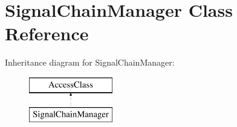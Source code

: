 \hypertarget{classSignalChainManager}{\section{Signal\-Chain\-Manager Class Reference}
\label{classSignalChainManager}
}
Inheritance diagram for Signal\-Chain\-Manager\-:\begin{figure}[H]
\begin{center}
\leavevmode
\includegraphics[height=2.000000cm]{classSignalChainManager}
\end{center}
\end{figure}
